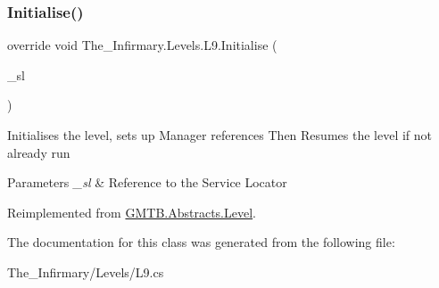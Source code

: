 \subsubsection{\texorpdfstring{Initialise()}{Initialise()}}
{\footnotesize\ttfamily override void The\+\_\+\+Infirmary.\+Levels.\+L9.\+Initialise (\begin{DoxyParamCaption}\item[{\mbox{\hyperlink{interface_g_m_t_b_1_1_interfaces_1_1_i_service_locator}{I\+Service\+Locator}}}]{\+\_\+sl }\end{DoxyParamCaption})\hspace{0.3cm}{\ttfamily [virtual]}}



Initialises the level, sets up Manager references Then Resumes the level if not already run 


\begin{DoxyParams}{Parameters}
{\em \+\_\+sl} & Reference to the Service Locator \\
\hline
\end{DoxyParams}


Reimplemented from \mbox{\hyperlink{class_g_m_t_b_1_1_abstracts_1_1_level_a0048401bb0fb66b0fb0c19b3b25e4265}{G\+M\+T\+B.\+Abstracts.\+Level}}.



The documentation for this class was generated from the following file\+:\begin{DoxyCompactItemize}
\item 
The\+\_\+\+Infirmary/\+Levels/L9.\+cs\end{DoxyCompactItemize}
